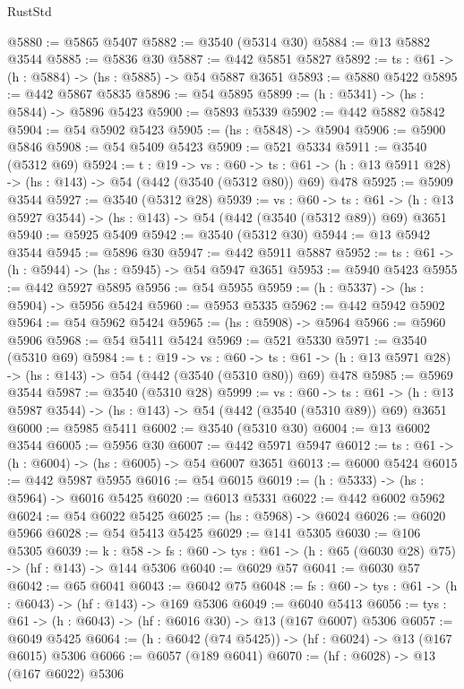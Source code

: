 \begin{lexlean}{RustStd}
\begin{coremodule}
@5880 := @5865 @5407
@5882 := @3540 (@5314 @30)
@5884 := @13 @5882 @3544
@5885 := @5836 @30
@5887 := @442 @5851 @5827
@5892 := {ts : @61} -> (h : @5884) -> (hs : @5885) -> @54 @5887 @3651
@5893 := @5880 @5422
@5895 := @442 @5867 @5835
@5896 := @54 @5895
@5899 := (h : @5341) -> (hs : @5844) -> @5896 @5423
@5900 := @5893 @5339
@5902 := @442 @5882 @5842
@5904 := @54 @5902 @5423
@5905 := (hs : @5848) -> @5904
@5906 := @5900 @5846
@5908 := @54 @5409 @5423
@5909 := @521 @5334
@5911 := @3540 (@5312 @69)
@5924 := {t : @19} ->
  {vs : @60} ->
  {ts : @61} -> (h : @13 @5911 @28) -> (hs : @143) -> @54 (@442 (@3540 (@5312 @80)) @69) @478
@5925 := @5909 @3544
@5927 := @3540 (@5312 @28)
@5939 := {vs : @60} ->
  {ts : @61} -> (h : @13 @5927 @3544) -> (hs : @143) -> @54 (@442 (@3540 (@5312 @89)) @69) @3651
@5940 := @5925 @5409
@5942 := @3540 (@5312 @30)
@5944 := @13 @5942 @3544
@5945 := @5896 @30
@5947 := @442 @5911 @5887
@5952 := {ts : @61} -> (h : @5944) -> (hs : @5945) -> @54 @5947 @3651
@5953 := @5940 @5423
@5955 := @442 @5927 @5895
@5956 := @54 @5955
@5959 := (h : @5337) -> (hs : @5904) -> @5956 @5424
@5960 := @5953 @5335
@5962 := @442 @5942 @5902
@5964 := @54 @5962 @5424
@5965 := (hs : @5908) -> @5964
@5966 := @5960 @5906
@5968 := @54 @5411 @5424
@5969 := @521 @5330
@5971 := @3540 (@5310 @69)
@5984 := {t : @19} ->
  {vs : @60} ->
  {ts : @61} -> (h : @13 @5971 @28) -> (hs : @143) -> @54 (@442 (@3540 (@5310 @80)) @69) @478
@5985 := @5969 @3544
@5987 := @3540 (@5310 @28)
@5999 := {vs : @60} ->
  {ts : @61} -> (h : @13 @5987 @3544) -> (hs : @143) -> @54 (@442 (@3540 (@5310 @89)) @69) @3651
@6000 := @5985 @5411
@6002 := @3540 (@5310 @30)
@6004 := @13 @6002 @3544
@6005 := @5956 @30
@6007 := @442 @5971 @5947
@6012 := {ts : @61} -> (h : @6004) -> (hs : @6005) -> @54 @6007 @3651
@6013 := @6000 @5424
@6015 := @442 @5987 @5955
@6016 := @54 @6015
@6019 := (h : @5333) -> (hs : @5964) -> @6016 @5425
@6020 := @6013 @5331
@6022 := @442 @6002 @5962
@6024 := @54 @6022 @5425
@6025 := (hs : @5968) -> @6024
@6026 := @6020 @5966
@6028 := @54 @5413 @5425
@6029 := @141 @5305
@6030 := @106 @5305
@6039 := {k : @58} ->
  {fs : @60} -> {tys : @61} -> (h : @65 (@6030 @28) @75) -> (hf : @143) -> @144 @5306
@6040 := @6029 @57
@6041 := @6030 @57
@6042 := @65 @6041
@6043 := @6042 @75
@6048 := {fs : @60} -> {tys : @61} -> (h : @6043) -> (hf : @143) -> @169 @5306
@6049 := @6040 @5413
@6056 := {tys : @61} -> (h : @6043) -> (hf : @6016 @30) -> @13 (@167 @6007) @5306
@6057 := @6049 @5425
@6064 := (h : @6042 (@74 @5425)) -> (hf : @6024) -> @13 (@167 @6015) @5306
@6066 := @6057 (@189 @6041)
@6070 := (hf : @6028) -> @13 (@167 @6022) @5306

\end{coremodule}
\end{lexlean}
